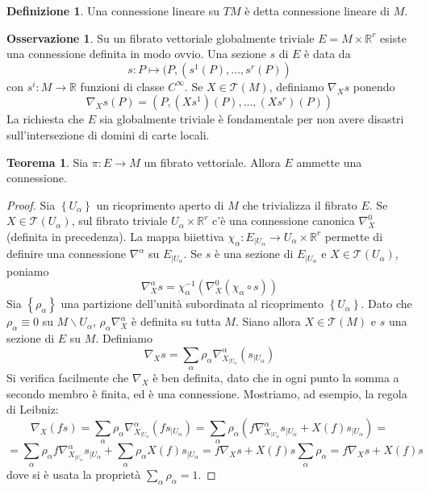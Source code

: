 \documentclass[a4paper,11pt]{article}
\theoremstyle{definition}
\newtheorem{osservazione}{Osservazione}[section]
\newtheorem{definizione}{Definizione}[section]
\theoremstyle{theorem}
\newtheorem{teorema}{Teorema}[section]
\newcommand{\R}{\mathbb{R}}
\newcommand{\T}{\mathcal{T}}
\begin{document}
\begin{definizione}
	Una connessione lineare su $TM$ è detta connessione lineare di $M$.
\end{definizione}
\begin{osservazione}
	Su un fibrato vettoriale globalmente triviale $E=M\times\R^r$ esiste una connessione definita in modo ovvio. Una sezione $s$ di $E$ è data da
	\[s\colon P\mapsto(P,(s^1(P),\dots,s^r(P))\]
	con $s^i\colon M\to\R$ funzioni di classe $C^\infty$. Se $X\in\T(M)$, definiamo $\nabla_Xs$ ponendo
	\[\nabla_Xs(P)=(P,(Xs^1)(P),\dots,(Xs^r)(P))\]
	La richiesta che $E$ sia globalmente triviale è fondamentale per non avere disastri sull'intersezione di domini di carte locali.
\end{osservazione}
\begin{teorema}
	Sia $\pi\colon E\to M$ un fibrato vettoriale. Allora $E$ ammette una connessione.
\end{teorema}
\begin{proof}
	Sia $\left\{U_{\alpha}\right\}$ un ricoprimento aperto di $M$ che trivializza il fibrato $E$. Se $X\in\T(U_{\alpha})$, sul fibrato triviale $U_{\alpha}\times\R^r$ c'è una connessione canonica $\nabla_X^0$ (definita in precedenza). La mappa biiettiva $\chi_{\alpha}\colon E_{|U_{\alpha}}\to U_{\alpha}\times\R^r$ permette di definire una connessione $\nabla^{\alpha}$ su $E_{|U_{\alpha}}$. Se $s$ è una sezione di $E_{|U_{\alpha}}$ e $X\in\T(U_{\alpha})$, poniamo
	\[\nabla_X^{\alpha}s=\chi^{-1}_{\alpha}\left(\nabla_X^0(\chi_{\alpha}\circ s)\right)\]
	Sia $\left\{\rho_{\alpha}\right\}$ una partizione dell'unità subordinata al ricoprimento $\left\{U_{\alpha}\right\}$. Dato che $\rho_{\alpha}\equiv0$ su $M\backslash U_{\alpha}$, $\rho_{\alpha}\nabla_X^{\alpha}$ è definita su tutta $M$. Siano allora $X\in\T(M)$ e $s$ una sezione di $E$ su $M$. Definiamo
	\[\nabla_Xs=\sum_{\alpha}\rho_{\alpha}\nabla^{\alpha}_{X_{|U_{\alpha}}}\left(s_{|U_{\alpha}}\right)\]
	Si verifica facilmente che $\nabla_X$ è ben definita, dato che in ogni punto la somma a secondo membro è finita, ed è una connessione. Mostriamo, ad esempio, la regola di Leibniz:
	\[\nabla_X(fs)=\sum_{\alpha}\rho_{\alpha}\nabla^{\alpha}_{X_{|U_{\alpha}}}\left(fs_{|U_{\alpha}}\right)=\sum_{\alpha}\rho_{\alpha}\left(f\nabla^{\alpha}_{X_{|U_{\alpha}}}s_{|U_{\alpha}}+X(f)s_{|U_{\alpha}}\right)=\]
	\[=\sum_{\alpha}\rho_{\alpha}f\nabla^{\alpha}_{X_{|U_{\alpha}}}s_{|U_{\alpha}}+\sum_{\alpha}\rho_{\alpha}X(f)s_{|U_{\alpha}}=f\nabla_Xs+X(f)s\sum_{\alpha}\rho_{\alpha}=f\nabla_Xs+X(f)s\]
	dove si è usata la proprietà $\sum_{\alpha}\rho_{\alpha}=1$.
\end{proof}
\end{document}
